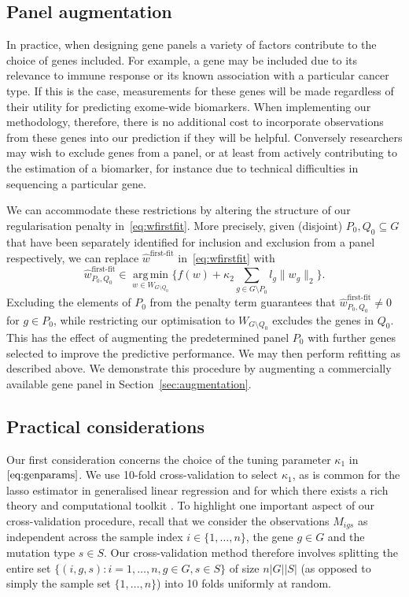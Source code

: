 \documentclass[12pt]{article}
\DeclareMathOperator*{\argmin}{arg\,min}
\begin{document}
\subsection{Panel augmentation \label{sec:panelaugmentation}}
In practice, when designing gene panels a variety of factors contribute to the choice of genes included. For example, a gene may be included due to its relevance to immune response or its known association with a particular cancer type. If this is the case, measurements for these genes will be made regardless of their utility for predicting exome-wide biomarkers. When implementing our methodology, therefore, there is no additional cost to incorporate observations from these genes into our prediction if they will be helpful. Conversely researchers may wish to exclude genes from a panel, or at least from actively contributing to the estimation of a biomarker, for instance due to technical difficulties in sequencing a particular gene. 

We can accommodate these restrictions by altering the structure of our regularisation penalty in~\eqref{eq:wfirstfit}.  More precisely, given (disjoint) $P_0, Q_0 \subseteq G$ that have been separately identified for inclusion and exclusion from a panel respectively, we can replace $\hat{w}^{\text{first-fit}}$ in~\eqref{eq:wfirstfit} with 
\begin{equation} \label{eq:augment}
\hat{w}_{P_0, Q_0}^{\text{first-fit}} \in \argmin\limits_{w \in W_{G \setminus Q_0}} \bigl\{ f(w) + \kappa_2 \sum_{g \in G\setminus P_0} l_g \|w_g\|_2 \bigr\}.  
\end{equation}
Excluding the elements of $P_0$ from the penalty term guarantees that $\hat{w}_{P_0, Q_0}^{\text{first-fit}} \neq 0$ for $g \in P_0$, while restricting our optimisation to $W_{G \setminus Q_0}$ excludes the genes in $Q_0$. This has the effect of augmenting the predetermined panel $P_0$ with further genes selected to improve the predictive performance. We may then perform refitting as described above. We demonstrate this procedure by augmenting a commercially available gene panel in Section~\ref{sec:augmentation}.

\subsection{Practical considerations \label{sec:practicalconsiderations}}
Our first consideration concerns the choice of the tuning parameter $\kappa_1$ in $\eqref{eq:genparams}$. We use 10-fold cross-validation to select $\kappa_1$, as is common for the \acrshort{lasso} estimator in generalised linear regression and for which there exists a rich theory and computational toolkit \citep{michoel_natural_2016, friedman_glmnet_2020}. To highlight one important aspect of our cross-validation procedure, recall that we consider the observations $M_{igs}$ as independent across the sample index $i \in \{1, \ldots, n\}$, the gene $g\in G$ and the mutation type $s\in S$. Our cross-validation method therefore involves splitting the entire set $\{(i,g,s): i = 1, \ldots, n, g \in G, s \in S\}$ of size $n|G||S|$ (as opposed to simply the sample set $\{1, \ldots, n\}$) into 10 folds uniformly at random.
\end{document}
